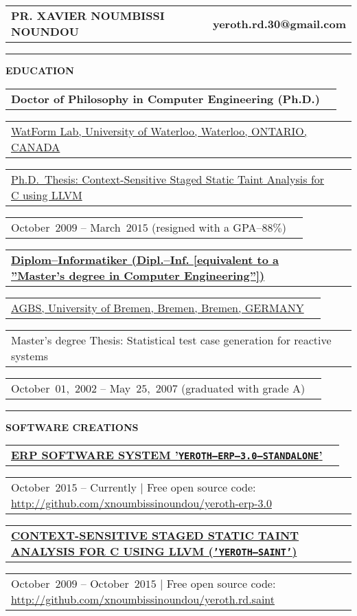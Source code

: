 \documentclass[9pt,a4paper]{article} %
\makeatletter
\newcommand{\headerrow}[2]
{\begin{tabular*}{\linewidth}{l@{\extracolsep{\fill}}r}
	#1 &
	#2 \\
\end{tabular*}}
\newcommand{\headerrowONE}[1]{\headerrow{#1}{}}
\newcommand{\cvitemdate}[2]{#1~$#2$\xspace}
\makeatother
\begin{document}
\bigskip


\headerrow
	{\Large \textbf{PR. XAVIER NOUMBISSI NOUNDOU}}	
	{\large \textbf{yeroth.rd.30@gmail.com}}

\vspace{1em}


\hrule
\begin{center}
{\large \textbf{EDUCATION}}
\end{center}

\vspace{0.5em}

\headerrowONE{\textbf{Doctor of Philosophy in Computer Engineering (Ph.D.)}}	
\headerrowONE{\href{http://watform.uwaterloo.ca/}{WatForm Lab, University of Waterloo, Waterloo, ONTARIO, CANADA}}
\headerrowONE{\href{http://archive.org/details/yeroth-saint}{Ph.D.~Thesis: Context-Sensitive Staged Static Taint Analysis for C using LLVM}}
\headerrowONE{\cvitemdate{October}{2009} -- \cvitemdate{March}{2015} (resigned with a GPA--$88\%$)}	
	
\vspace{0.3em}
	
\headerrowONE{\href{http://www.informatik.uni-bremen.de/agbs/qualifikationsarbeiten/diplomarbeiten_e.html}{\textbf{Diplom--Informatiker (Dipl.--Inf. [equivalent to a ''Master's degree in Computer Engineering''])}}}
\headerrowONE{\href{http://www.informatik.uni-bremen.de/agbs/}{AGBS, University of Bremen, Bremen, Bremen, GERMANY}}	
\headerrowONE{Master's degree Thesis: Statistical test case generation for reactive systems}
\headerrowONE{\cvitemdate{October~$01$,}{2002} -- \cvitemdate{May~$25$,}{2007} (graduated with grade A)}	

\vspace{1em}

\hrule
\begin{center}
{\large \textbf{SOFTWARE CREATIONS}}
\end{center}

\vspace{0.5em}

\headerrowONE{\href{http://archive.org/details/yeroth-erp-3-0-info-english}{\textbf{ERP SOFTWARE SYSTEM '\texttt{YEROTH--ERP--3.0--STANDALONE}'}}}		
\headerrowONE{\cvitemdate{October}{2015} -- Currently | Free open source code: \url{http://github.com/xnoumbissinoundou/yeroth-erp-3.0}}

\vspace{0.3em}

\headerrowONE{\href{http://archive.org/details/yeroth-saint}{\textbf{CONTEXT-SENSITIVE STAGED STATIC TAINT ANALYSIS FOR C USING LLVM (\texttt{'YEROTH--SAINT'})}}}
\headerrowONE{\cvitemdate{October}{2009} -- \cvitemdate{October}{2015} | Free open source code: \url{http://github.com/xnoumbissinoundou/yeroth.rd.saint}}
	
\end{document}
